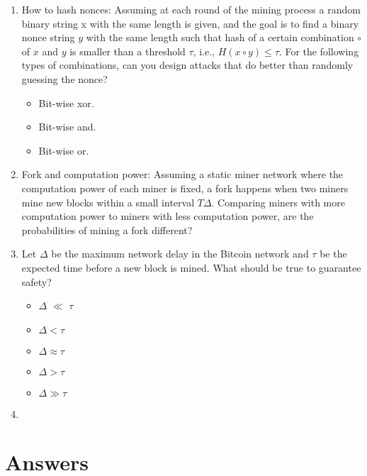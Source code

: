 \documentclass{report}
\begin{document}
\begin{enumerate}
\begin{itemize}
	\end{itemize}
	\item How to hash nonces: Assuming at each round of the mining process a random binary string x with the same length is given, and the goal is to find a binary nonce string $y$ with the same length such that hash of a certain combination $\circ$ of $x$ and $y$ is smaller than a threshold $\tau$, i.e., $H(x \circ y) \leq \tau$. For the following types of combinations, can you design attacks that do better than randomly guessing the nonce?
	\begin{itemize}
		\item Bit-wise xor.
		\item Bit-wise and.
		\item Bit-wise or.
	\end{itemize} 
	\item Fork and computation power: Assuming a static miner network where the computation power of each miner is fixed, a fork happens when two miners mine new blocks within a small interval $T\Delta$. Comparing miners with more computation power to miners with less computation power, are the probabilities of mining a fork different?
	\item Let $\Delta$ be the maximum network delay in the Bitcoin network and $\tau$ be the expected time before a new block is mined. What should be true to guarantee safety?
	\begin{itemize}
		\item $\Delta$ $\ll$ $\tau$
		\item  $\Delta < \tau$
		\item $\Delta \approx \tau$
		\item $\Delta > \tau$
		\item $\Delta \gg \tau$ 
	\end{itemize}
	\item 
\end{enumerate}

\section{Answers}
\end{document}
